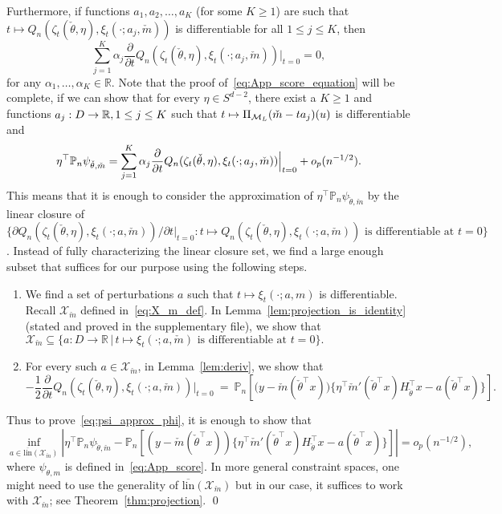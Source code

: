 {Furthermore, if functions $a_1, a_2, \ldots, a_K$ (for some $K\ge1$) are such that $t\mapsto Q_n(\zeta_t(\check\theta,\eta), \xi_t(\cdot;a_j, \check{m}))$ is differentiable for all $1\le j\le K$, then
\[
\sum_{j=1}^{K} \alpha_j\frac{\partial}{\partial t} Q_n(\zeta_t(\check\theta,\eta), \xi_t(\cdot;a_j, \check{m}))\Big|_{t=0}=0,
\]
for any $\alpha_1,\ldots,\alpha_K\in\mathbb{R}$. Note that the proof of~\eqref{eq:App_score_equation} will be complete, if we can show that for every $\eta\in S^{d-2}$, there exist a $K\ge1$ and functions $a_j: D\to \mathbb{R}, 1\le j\le K$ such that $t\mapsto \Pi_{\mathcal{M}_L}(\check{m} - t a_j)(u)$ is differentiable and 
\begin{equation}\label{eq:psi_approx_phi}
\eta^\top   \mathbb{P}_n \psi_{\check{\theta}, \check{m}} = \sum_{j=1}^K \alpha_j\frac{\partial}{\partial t} Q_n(\zeta_t(\check\theta,\eta), \xi_t(\cdot;a_j, \check{m}))\Big|_{t=0} + o_p(n^{-1/2}).
\end{equation}
This means that it is enough to consider the approximation of $\eta^{\top}\mathbb{P}_n\psi_{\check{\theta},\check{m}}$ by the linear closure of $\{\partial Q_n(\zeta_t(\check\theta,\eta), \xi_t(\cdot;a, \check{m}))/\partial t|_{t=0}: t\mapsto Q_n(\zeta_t(\check\theta,\eta), \xi_t(\cdot;a, \check{m}))\mbox{ is differentiable at } t=0\}$. {Instead of fully characterizing the linear closure set, we find a large enough subset that suffices for our purpose using the following steps.}
\begin{enumerate}
\item We find a set of perturbations $a$ such that $t\mapsto \xi_t(\cdot;a, {m})$ is differentiable. Recall $\mathcal{X}_{\check{m}}$ defined in~\eqref{eq:X_m_def}. In Lemma~\ref{lem:projection_is_identity} (stated and proved in the supplementary file), we show that $\mathcal{X}_{\check{m}} \subseteq \{a:D\to\mathbb{R}\,|\,t\mapsto\xi_t(\cdot; a, \check{m}) \text{ is differentiable at } t=0\}.$
\item For every such $a\in\mathcal{X}_{\check{m}}$, in Lemma~\ref{lem:deriv}, we show that
\[
-\frac{1}{2}\frac{\partial}{\partial t}Q_n(\zeta_t(\check\theta,\eta), \xi_t(\cdot;a, \check{m}))\Big|_{t = 0} ~=~ \mathbb{P}_n\left[\big(y-\check{m}(\check\theta^\top x)\big)\Big\{ \eta^\top  \check{m}'(\check\theta ^\top x) H_{\check\theta}^\top x - a(\check\theta^\top x)\Big\}\right].
\]
\end{enumerate}
Thus to prove~\eqref{eq:psi_approx_phi}, it is enough to show that
\[
\inf_{a\in\overline{\mathrm{lin}}(\mathcal{X}_{\check{m}})}\left|\eta^{\top}\mathbb{P}_n\psi_{\check{\theta},\check{m}} - \mathbb{P}_n\left[(y-\check{m}(\check\theta^\top x))\{ \eta^\top  \check{m}'(\check\theta ^\top x) H_{\check\theta}^\top x - a(\check\theta^\top x)\}\right]\right| = o_p(n^{-1/2}),
\] 
where $\psi_{\theta, m}$ is defined in~\eqref{eq:App_score}.
In more general constraint spaces, one might need to use the generality of $\overline{\mathrm{lin}}(\mathcal{X}_{\check{m}})$ but in our case, it suffices to work with $\mathcal{X}_{\check{m}}$; see Theorem~\ref{thm:projection}. \qed

}
